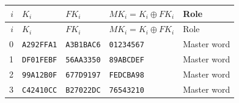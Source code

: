 \begingroup\small
\begin{longtable}{rllll}
\toprule
$i$ & $K_i$ & $FK_i$ & $MK_i=K_i\oplus FK_i$ & Role\\
\midrule
\endfirsthead
\toprule
$i$ & $K_i$ & $FK_i$ & $MK_i=K_i\oplus FK_i$ & Role\\
\midrule
\endhead
0 & \texttt{A292FFA1} & \texttt{A3B1BAC6} & \texttt{01234567} & Master word\\
1 & \texttt{DF01FEBF} & \texttt{56AA3350} & \texttt{89ABCDEF} & Master word\\
2 & \texttt{99A12B0F} & \texttt{677D9197} & \texttt{FEDCBA98} & Master word\\
3 & \texttt{C42410CC} & \texttt{B27022DC} & \texttt{76543210} & Master word\\
\bottomrule
\end{longtable}
\endgroup
